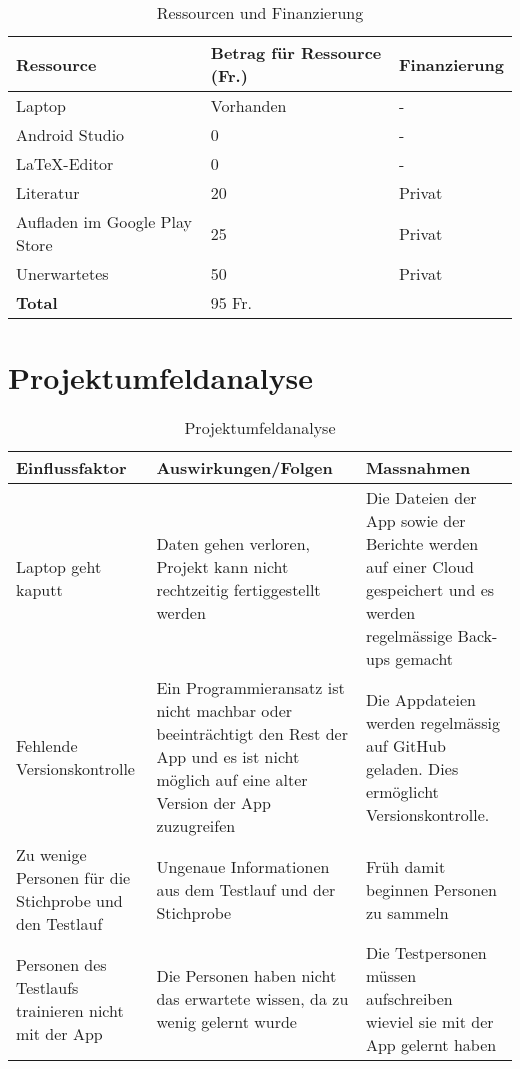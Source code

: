 \begin{center}
\begin{table}[h]
\begin{tabularx}{\textwidth}{X|X|X}
    \textbf{Ressource} & \textbf{Betrag für Ressource (Fr.)} & \textbf{Finanzierung} \\ \hline
    Laptop & Vorhanden & - \\
    Android Studio & 0 & - \\
    \LaTeX -Editor & 0 & - \\
    Literatur & 20 & Privat\\
    Aufladen im Google Play Store & 25 & Privat \\
    Unerwartetes & 50 & Privat \\ \hline
    \textbf{Total} & 95 Fr. & 
\end{tabularx}
\caption{Ressourcen und Finanzierung}
\end{table}
\end{center}

\section{Projektumfeldanalyse}
\begin{table}[h]
\begin{tabularx}{\textwidth}{p{}|X|X}
    \textbf{Einflussfaktor} & \textbf{Auswirkungen/Folgen} & \textbf{Massnahmen} \\ \hline
    Laptop geht kaputt & Daten gehen verloren, Projekt kann nicht rechtzeitig fertiggestellt werden & Die Dateien der App sowie der Berichte werden auf einer Cloud gespeichert und es werden regelmässige Back-ups gemacht\\ \hline
    Fehlende Versionskontrolle & Ein Programmieransatz ist nicht machbar oder beeinträchtigt den Rest der App und es ist nicht möglich auf eine alter Version der App zuzugreifen & Die Appdateien werden regelmässig auf GitHub geladen. Dies ermöglicht Versionskontrolle. \\ \hline
    Zu wenige Personen für die Stichprobe und den Testlauf & Ungenaue Informationen aus dem Testlauf und der Stichprobe & Früh damit beginnen Personen zu sammeln \\ \hline
    Personen des Testlaufs trainieren nicht mit der App & Die Personen haben nicht das erwartete wissen, da zu wenig gelernt wurde & Die Testpersonen müssen aufschreiben wieviel sie mit der App gelernt haben \\
\end{tabularx}
\caption{Projektumfeldanalyse}
\end{table}